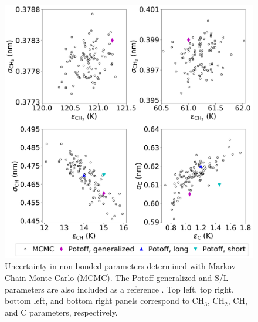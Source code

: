 \documentclass[preprint,review,12pt]{elsarticle}
\begin{document}
	
	
    
    \begin{figure}[htb!]
    	\centering
    	\includegraphics[width=6.4in]{MCMC_nonbonded.pdf}
    	\caption{Uncertainty in non-bonded parameters determined with Markov Chain Monte Carlo (MCMC). The Potoff generalized and S/L parameters are also included as a reference \cite{Mie,Potoff_branched}. Top left, top right, bottom left, and bottom right panels correspond to CH$_3$, CH$_2$, CH, and C parameters, respectively.}		
    	\label{fig:nonbonded_uncertainty}
    \end{figure}
    
\end{document}
